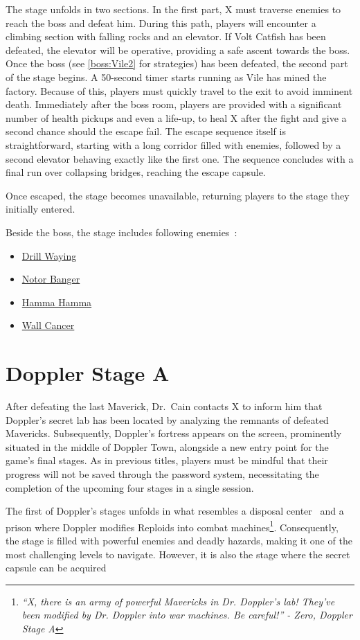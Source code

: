 The stage unfolds in two sections. In the first part, X must traverse enemies to reach the boss and defeat him. During this path, players will encounter a climbing section with falling rocks and an elevator. If Volt Catfish has been defeated, the elevator will be operative, providing a safe ascent towards the boss. Once the boss (see \ref{boss:Vile2} for strategies) has been defeated, the second part of the stage begins. A 50-second timer starts running as Vile has mined the factory. Because of this, players must quickly travel to the exit to avoid imminent death. Immediately after the boss room, players are provided with a significant number of health pickups and even a life-up, to heal X after the fight and give a second chance should the escape fail. The escape sequence itself is straightforward, starting with a long corridor filled with enemies, followed by a second elevator behaving exactly like the first one. The sequence concludes with a final run over collapsing bridges, reaching the escape capsule.

Once escaped, the stage becomes unavailable, returning players to the stage they initially entered.

Beside the boss, the stage includes following enemies~\cite{wiki:Vile_stage}:
\begin{itemize}
	\item \hyperlink{enem:Drill_Waying}{Drill Waying}
	\item \hyperlink{enem:Notor_Banger}{Notor Banger}
	\item \hyperlink{enem:Hamma_Hamma}{Hamma Hamma}
	\item \hyperlink{enem:Wall_Cancer}{Wall Cancer}
\end{itemize} 	 	



\section{Doppler Stage A}
After defeating the last Maverick, Dr.~Cain contacts X to inform him that Doppler's secret lab has been located by analyzing the remnants of defeated Mavericks. Subsequently, Doppler's fortress appears on the screen, prominently situated in the middle of Doppler Town, alongside a new entry point for the game's final stages. As in previous titles, players must be mindful that their progress will not be saved through the password system, necessitating the completion of the upcoming four stages in a single session.

The first of Doppler's stages unfolds in what resembles a disposal center~\cite{wiki:Doppler_stage} and a prison where Doppler modifies Reploids into combat machines\footnote{\textit{``X, there is an army of powerful Mavericks in Dr. Doppler’s lab! They’ve been modified by Dr. Doppler into war machines. Be careful!'' - Zero, Doppler Stage A}}. Consequently, the stage is filled with powerful enemies and deadly hazards, making it one of the most challenging levels to navigate. However, it is also the stage where the secret capsule can be acquired

